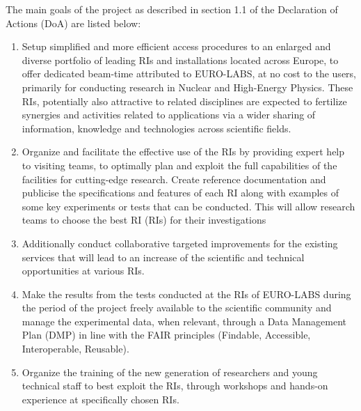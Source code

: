 The main goals of the project as described in section 1.1 of the Declaration of Actions (DoA) are listed below: 
\begin{tcolorbox}[myliststyle]
\begin{enumerate}[label=\textbf{\arabic*.}, nosep, left=0pt]
    \item Setup simplified and more efficient access procedures to an enlarged and diverse portfolio of leading RIs and installations located across Europe, to offer dedicated beam-time attributed to EURO-LABS, at no cost to the users, primarily for conducting research in Nuclear and High-Energy Physics. These RIs, potentially also attractive to related disciplines are expected to fertilize synergies and activities related to applications via a wider sharing of information, knowledge and technologies across scientific fields.
    \item Organize and facilitate the effective use of the RIs by providing expert help to visiting teams, to optimally plan and exploit the full capabilities of the facilities for cutting-edge research. Create reference documentation and publicise the specifications and features of each RI along with examples of some key experiments or tests that can be conducted. This will allow research teams to choose the best RI (RIs) for their investigations
    \item Additionally conduct collaborative targeted improvements for the existing services that will lead to an increase of the scientific and technical opportunities at various RIs.
    \item Make the results from the tests conducted at the RIs of EURO-LABS during the period of the project freely available to the scientific community and manage the experimental data, when relevant, through a Data Management Plan (DMP) in line with the FAIR principles (Findable, Accessible, Interoperable, Reusable).
    \item Organize the training of the new generation of researchers and young technical staff to best exploit the RIs, through workshops and hands-on experience at specifically chosen RIs.
\end{enumerate}
\end{tcolorbox}


